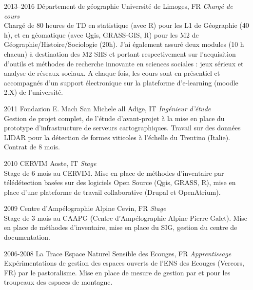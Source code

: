 \documentclass[]{cv-etienne}
\begin{document}
\begin{entrylist}
\entry
{2013--2016}
{Département de géographie}
{Université de Limoges, FR}
{\emph{Chargé de cours} \\
Chargé de 80 heures de TD en statistique (avec R) pour les L1 de Géographie (40 h), et en géomatique (avec Qgis, GRASS-GIS, R) pour les M2 de Géographie/Histoire/Sociologie (20h). J'ai également assuré deux modules (10 h chacun) à destination des M2 SHS et portant respectivement sur l’acquisition d’outils et méthodes de recherche innovante en sciences sociales : jeux sérieux et analyse de réseaux sociaux. A chaque fois, les cours sont en présentiel et accompagnés d'un support électronique sur la plateforme d'e-learning (moodle 2.X) de l'université.
}
\end{entrylist}
\begin{entrylist}
\entry
{2011}
{Fondazion E. Mach}
{San Michele all Adige, IT}
{\emph{Ingénieur d'étude}\\
Gestion de projet complet, de l'étude d'avant-projet à la mise en place du prototype d'infrastructure de serveurs cartographiques. Travail sur des données LIDAR pour la détection de formes viticoles à l'échelle du Trentino (Italie). Contrat de 8 mois.
}
\end{entrylist}
\begin{entrylist}
\entry
{2010}
{CERVIM}
{Aoste, IT}
{\emph{Stage}\\
Stage de 6 mois au CERVIM. Mise en place de méthodes d'inventaire par télédétection basées sur des logiciels Open Source (Qgis, GRASS, R), mise en place d’une plateforme de travail collaborative (Drupal et OpenAtrium).
}
\end{entrylist}
\begin{entrylist}
\entry
{2009}
{Centre d'Ampélographie Alpine}
{Cevin, FR}
{\emph{Stage}\\
Stage de 3 mois au CAAPG (Centre d'Ampélographie Alpine Pierre Galet). Mise en place de méthodes d'inventaire, mise en place du SIG, gestion du centre de documentation.
}
\end{entrylist}
\begin{entrylist}
\entry
{2006-2008}
{La Trace}
{Espace Naturel Sensible des Ecouges, FR}
{\emph{Apprentissage}\\
Expérimentations de gestion des espaces ouverts de l'ENS des Ecouges (Vercors, FR) par le pastoralisme. Mise en place de mesure de gestion par et pour les troupeaux des espaces de montagne.
}
\end{entrylist}
\end{document}
